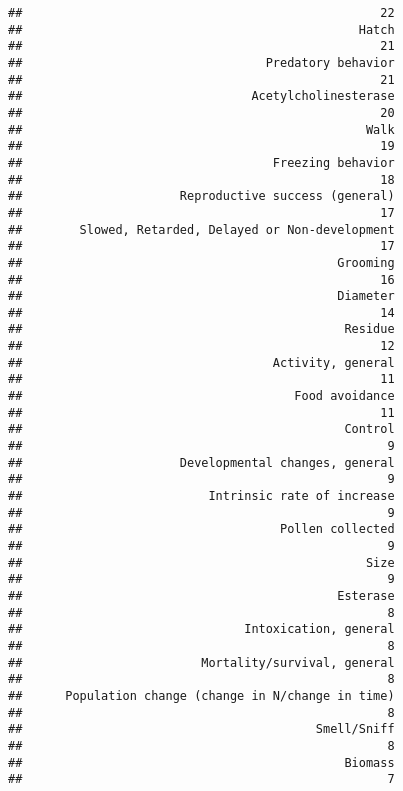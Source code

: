 \documentclass[]{article}
\begin{document}
\begin{verbatim}
##                                                  22 
##                                               Hatch 
##                                                  21 
##                                  Predatory behavior 
##                                                  21 
##                                Acetylcholinesterase 
##                                                  20 
##                                                Walk 
##                                                  19 
##                                   Freezing behavior 
##                                                  18 
##                      Reproductive success (general) 
##                                                  17 
##        Slowed, Retarded, Delayed or Non-development 
##                                                  17 
##                                            Grooming 
##                                                  16 
##                                            Diameter 
##                                                  14 
##                                             Residue 
##                                                  12 
##                                   Activity, general 
##                                                  11 
##                                      Food avoidance 
##                                                  11 
##                                             Control 
##                                                   9 
##                      Developmental changes, general 
##                                                   9 
##                          Intrinsic rate of increase 
##                                                   9 
##                                    Pollen collected 
##                                                   9 
##                                                Size 
##                                                   9 
##                                            Esterase 
##                                                   8 
##                               Intoxication, general 
##                                                   8 
##                         Mortality/survival, general 
##                                                   8 
##      Population change (change in N/change in time) 
##                                                   8 
##                                         Smell/Sniff 
##                                                   8 
##                                             Biomass 
##                                                   7 

\end{verbatim}
\end{document}
